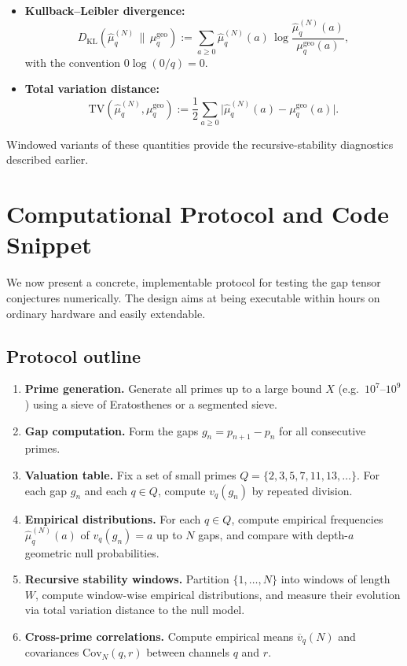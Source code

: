 \documentclass[11pt]{article}
\theoremstyle{definition}
\theoremstyle{plain}
\theoremstyle{remark}
\newcommand{\Cov}{\mathrm{Cov}}
\newcommand{\vq}{v_q}
\newcommand{\1}{\mathbb{1}}
\begin{document}
\begin{itemize}[leftmargin=*]
  \item \textbf{Kullback--Leibler divergence:}
  \[
    D_{\mathrm{KL}}(\hat{\mu}_q^{(N)} \,\|\, \mu_q^{\mathrm{geo}}) 
    := \sum_{a\ge 0} \hat{\mu}_q^{(N)}(a)\,\log\frac{\hat{\mu}_q^{(N)}(a)}{\mu_q^{\mathrm{geo}}(a)},
  \]
  with the convention \(0\log(0/q) = 0\).
  \item \textbf{Total variation distance:}
  \[
    \mathrm{TV}(\hat{\mu}_q^{(N)}, \mu_q^{\mathrm{geo}}) 
    := \frac{1}{2} \sum_{a\ge 0} \big|\hat{\mu}_q^{(N)}(a) - \mu_q^{\mathrm{geo}}(a)\big|.
  \]
\end{itemize}

Windowed variants of these quantities provide the recursive-stability diagnostics described earlier.

\section{Computational Protocol and Code Snippet}

We now present a concrete, implementable protocol for testing the gap tensor conjectures numerically. The design aims at being executable within hours on ordinary hardware and easily extendable.

\subsection{Protocol outline}

\begin{enumerate}[label=\textbf{Step \arabic*.},leftmargin=*]
  \item \textbf{Prime generation.} Generate all primes up to a large bound \(X\) (e.g.\ \(10^7\)--\(10^9\)) using a sieve of Eratosthenes or a segmented sieve.
  \item \textbf{Gap computation.} Form the gaps \(g_n = p_{n+1}-p_n\) for all consecutive primes.
  \item \textbf{Valuation table.} Fix a set of small primes \(Q = \{2,3,5,7,11,13,\dots\}\). For each gap \(g_n\) and each \(q\in Q\), compute \(\vq(g_n)\) by repeated division.
  \item \textbf{Empirical distributions.} For each \(q\in Q\), compute empirical frequencies \(\hat{\mu}_q^{(N)}(a)\) of \(\vq(g_n)=a\) up to \(N\) gaps, and compare with depth-\(a\) geometric null probabilities.
  \item \textbf{Recursive stability windows.} Partition \(\{1,\dots, N\}\) into windows of length \(W\), compute window-wise empirical distributions, and measure their evolution via total variation distance to the null model.
  \item \textbf{Cross-prime correlations.} Compute empirical means \(\overline{v}_q(N)\) and covariances \(\Cov_N(q,r)\) between channels \(q\) and \(r\).
\end{enumerate}
\end{document}
